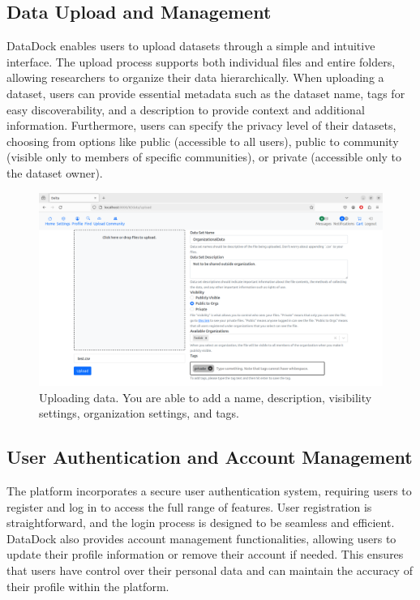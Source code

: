 \documentclass[conference]{IEEEtran}
\begin{document}
\subsection{Data Upload and Management}
DataDock enables users to upload datasets through a simple and intuitive interface. The upload process supports both individual files and entire folders, allowing researchers to organize their data hierarchically. When uploading a dataset, users can provide essential metadata such as the dataset name, tags for easy discoverability, and a description to provide context and additional information. Furthermore, users can specify the privacy level of their datasets, choosing from options like public (accessible to all users), public to community (visible only to members of specific communities), or private (accessible only to the dataset owner).
\begin{figure}[h]
  \centering
  \includegraphics[width=\columnwidth]{figures/upload_page.png}
  \caption{Uploading data. You are able to add a name, description, visibility settings, organization settings, and tags.}
  \label{fig:delta-upload}
\end{figure}

\subsection{User Authentication and Account Management}
The platform incorporates a secure user authentication system, requiring users to register and log in to access the full range of features. User registration is straightforward, and the login process is designed to be seamless and efficient. DataDock also provides account management functionalities, allowing users to update their profile information or remove their account if needed. This ensures that users have control over their personal data and can maintain the accuracy of their profile within the platform.
\end{document}
